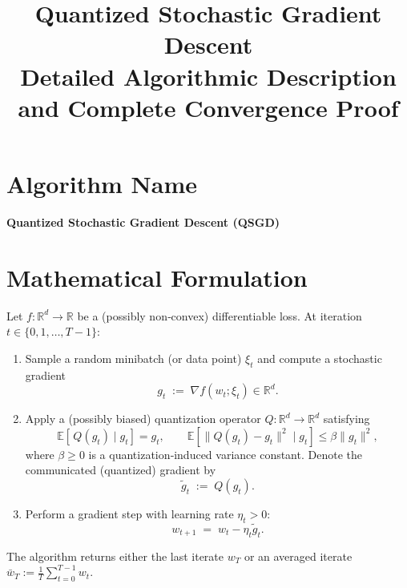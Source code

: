 \documentclass{article}
\newcommand{\E}{\mathbb{E}}
\newcommand{\R}{\mathbb{R}}
\begin{document}
\title{Quantized Stochastic Gradient Descent \\ Detailed Algorithmic Description and Complete Convergence Proof}
\author{}
\date{}
\maketitle

\tableofcontents
\newpage

\section*{Algorithm Name}
\begin{center}
\textbf{Quantized Stochastic Gradient Descent (QSGD)}
\end{center}

\section*{Mathematical Formulation}
Let $f:\R^d\rightarrow\R$ be a (possibly non‑convex) differentiable loss.  
At iteration $t\in\{0,1,\dots,T-1\}$:

\begin{enumerate}[label=\arabic*.]
    \item Sample a random minibatch (or data point) $\xi_t$ and compute a stochastic gradient
    \[
        g_t \;:=\; \nabla f(w_t;\xi_t)\in\R^d .
    \]
    \item Apply a (possibly biased) quantization operator $Q:\R^d\to\R^d$ satisfying
    \[
        \E\!\left[\,Q(g_t)\mid g_t\right]=g_t,\qquad
        \E\!\left[\|Q(g_t)-g_t\|^2\mid g_t\right]\le \beta\|g_t\|^2,
    \]
    where $\beta\ge0$ is a quantization‑induced variance constant.
    Denote the communicated (quantized) gradient by
    \[
        \tilde g_t \;:=\; Q(g_t).
    \]
    \item Perform a gradient step with learning rate $\eta_t>0$:
    \[
        w_{t+1}\;=\;w_t-\eta_t\tilde g_t .
    \]
\end{enumerate}
The algorithm returns either the last iterate $w_T$ or an averaged iterate
\(
    \bar w_T:=\frac1T\sum_{t=0}^{T-1}w_t .
\)

\end{document}
